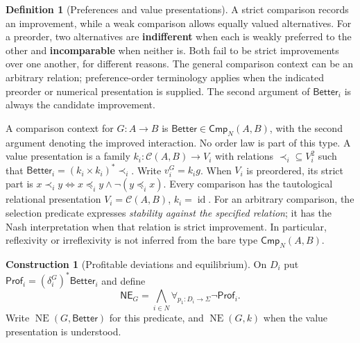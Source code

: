 \documentclass[11pt,a4paper]{article}
\numberwithin{equation}{section}
\theoremstyle{definition}
\newtheorem{definition}[theorem]{Definition}
\newtheorem{construction}[construction]{Construction}
\theoremstyle{remark}
\theoremstyle{plain}
\begin{document}
\begin{definition}[Preferences and value presentations]
\label{def:egt-preferences-and-value-presentations}
A strict comparison records an improvement, while a weak comparison
allows equally valued alternatives. For a preorder, two alternatives are
\textbf{indifferent} when each is weakly preferred to the other and
\textbf{incomparable} when neither is. Both fail to be strict improvements
over one another, for different reasons. The general comparison context can be an arbitrary relation; preference-order terminology applies
when the indicated preorder or numerical presentation is supplied.
The second argument of $\mathsf{Better}_i$ is always the candidate
improvement.

A comparison context for $G:A\to B$ is
$\mathsf{Better}\in\mathsf{Cmp}_N(A,B)$, with the second argument denoting
the improved interaction. No order law is part of this type. A value
presentation is a family $k_i:\mathcal C(A,B)\to V_i$ with relations
$\prec_i\subseteq V_i^2$ such that
$\mathsf{Better}_i=(k_i\times k_i)^*\prec_i$.
Write $v_i^G=k_ig$. When $V_i$ is preordered, its strict part is
$x\prec_i y\iff x\preceq_i y\wedge\neg(y\preceq_i x)$.
Every comparison has the tautological relational presentation
$V_i=\mathcal C(A,B)$, $k_i=\operatorname{id}$.
For an arbitrary comparison, the selection predicate expresses \emph{stability against the specified relation}; it has the Nash
interpretation when that relation is strict improvement. In particular,
reflexivity or irreflexivity is not inferred from the bare type
$\mathsf{Cmp}_N(A,B)$.
\end{definition}

\begin{construction}[Profitable deviations and equilibrium]
On $D_i$ put $\mathsf{Prof}_i=(\delta_i^G)^*\mathsf{Better}_i$ and define
\begin{equation}\label{eq:egt-ne-doctrine}
 \mathsf{NE}_G=\bigwedge_{i\in N}\forall_{p_1:D_i\to\Sigma}
 \neg\mathsf{Prof}_i.
\end{equation}
Write $\operatorname{NE}(G,\mathsf{Better})$ for this predicate, and
$\operatorname{NE}(G,k)$ when the value presentation is understood.
\end{construction}
\end{document}
